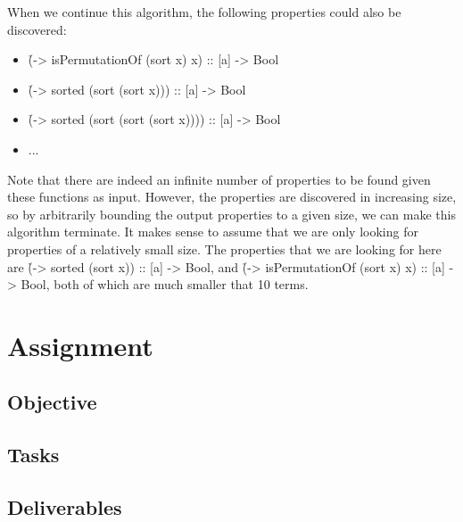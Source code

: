 \documentclass[a4paper, 11pt]{article}
\begin{document}
When we continue this algorithm, the following properties could also be discovered:

\begin{itemize}
  \item \h{(\x -> isPermutationOf (sort x) x) :: [a] -> Bool}
  \item \h{(\x -> sorted (sort (sort x))) :: [a] -> Bool}
  \item \h{(\x -> sorted (sort (sort (sort x)))) :: [a] -> Bool}
  \item ...
\end{itemize}

Note that there are indeed an infinite number of properties to be found given these functions as input.
However, the properties are discovered in increasing size, so by arbitrarily bounding the output properties to a given size, we can make this algorithm terminate.
It makes sense to assume that we are only looking for properties of a relatively small size.
The properties that we are looking for here are \h{(\x -> sorted (sort x)) :: [a] -> Bool}, and \h{(\x -> isPermutationOf (sort x) x) :: [a] -> Bool}, both of which are much smaller that 10 terms.


\section{Assignment}
\subsection{Objective}

\subsection{Tasks}


\subsection{Deliverables}



\end{document}
